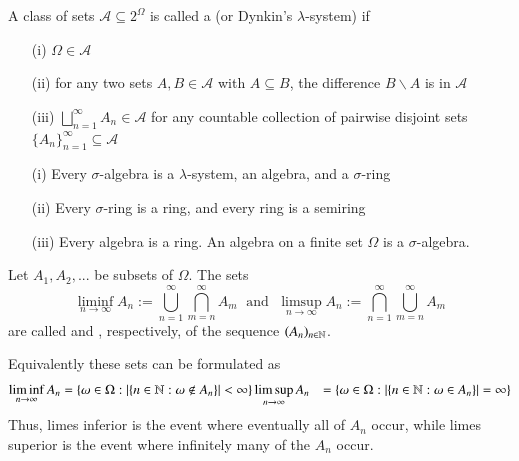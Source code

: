 \documentclass[12pt, a4paper, oneside, openright, titlepage]{book}
\begin{document}
\begin{defn}
    A class of sets $\mathcal{A} \subseteq 2^{\Omega}$ is called a  (or Dynkin's $\lambda$-system) if  \begin{itemize}
        \item[(i)] $\Omega \in \mathcal{A}$ 
        \item[(ii)] for any two sets $A,B\in\mathcal{A}$ with $A\subseteq B$, the difference $B\backslash A$ is in $\mathcal{A}$
        \item[(iii)] $\bigsqcup_{n=1}^{\infty}A_n \in \mathcal{A}$ for any countable collection of pairwise disjoint sets $\{A_n\}_{n=1}^{\infty} \subseteq \mathcal{A}$
    \end{itemize}
\end{defn}

\begin{thm}
    \leavevmode
    \begin{itemize}
        \item[(i)] Every $\sigma$-algebra is a $\lambda$-system, an algebra, and a $\sigma$-ring
        \item[(ii)] Every $\sigma$-ring is a ring, and every ring is a semiring
        \item[(iii)] Every algebra is a ring. An algebra on a finite set $\Omega$ is a $\sigma$-algebra.
    \end{itemize}
\end{thm}

\begin{defn}
    Let $A_1,A_2,...$ be subsets of $\Omega$. The sets \begin{equation*}
        \liminf_{n\rightarrow \infty}A_n := \bigcup_{n=1}^{\infty}\bigcap_{m=n}^{\infty}A_m\;\text{ and }\;\limsup_{n\rightarrow \infty}A_n := \bigcap_{n=1}^{\infty}\bigcup_{m=n}^{\infty}A_m
    \end{equation*}
    are called  and , respectively, of the sequence $(A_n)_{n\in\mathbb N}$.
\end{defn}

Equivalently these sets can be formulated as \begin{align*}
    \liminf_{n\rightarrow\infty}A_n &= \{\omega \in \Omega: |\{n \in \mathbb N:\omega \notin A_n\}| < \infty\}
    \limsup_{n\rightarrow \infty}A_n &= \{\omega \in \Omega: |\{n\in\mathbb N: \omega \in A_n\}| = \infty\}
\end{align*}
Thus, limes inferior is the event where eventually all of $A_n$ occur, while limes superior is the event where infinitely many of the $A_n$ occur.
\end{document}

